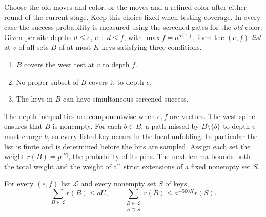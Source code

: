 Choose the old moves and color, or the moves and a refined color after
either round of the current stage. Keep this choice fixed when testing
coverage. In every case the success probability is measured using
the screened gates for the \emph{old} color. Given per-site depths
\(d\le e\), \(e+d\le f\), with \(\max f=a^{o(1)}\), form the
\emph{\((e,f)\) list} at \(v\) of all sets \(B\) of at most \(K\) keys
satisfying three conditions.
\begin{enumerate}
\item \(B\) covers the west test at \(v\) to depth \(f\).
\item No proper subset of \(B\) covers it to depth \(e\).
\item The keys in \(B\) can have simultaneous screened success.
\end{enumerate}
The depth inequalities are componentwise when \(e,f\) are vectors.
The west spine ensures that \(B\) is nonempty. For each \(b\in B\),
a path missed by \(B\setminus\{b\}\) to depth \(e\) must charge \(b\),
so every listed key occurs in the local unfolding. In particular the
list is finite and is determined before the bits are sampled. Assign
each set the weight \(r(B)=p^{|B|}\), the probability of its pins.
The next lemma bounds both the total weight and the weight of all
strict extensions of a fixed nonempty set \(S\).

\begin{lemma}\label{lem:cut-list}
For every $(e,f)$ list $\mathcal L$ and every nonempty set $S$ of keys,
\[
 \sum_{B\in\mathcal L}r(B)\le aU,
 \qquad
 \sum_{\substack{B\in\mathcal L\\ B\supsetneq S}}r(B)
       \le a^{-500K}r(S).
\]
\end{lemma}

